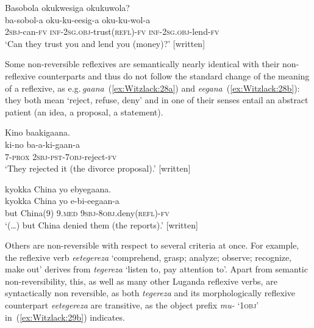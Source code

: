 \documentclass[output=paper,colorlinks,citecolor=brown,
]{langscibook}
\begin{document}
\ea \label{ex:Witzlack:27}
 
    \glll Basobola okukwesiga okukuwola?\\
    ba-sobol-a	oku-ku-eesig-a	oku-ku-wol-a\\
    \textsc{2sbj}-can-\textsc{fv}	\textsc{inf-2sg.obj}-trust(\textsc{refl})-\textsc{fv}	\textsc{inf-2sg.obj}-lend-\textsc{fv}\\
    \glt ‘Can they trust you and lend you (money)?’ [written] %

\z

Some non-reversible reflexives are semantically nearly identical with their non-reflexive counterparts and thus do not follow the standard change of the meaning of a reflexive, as e.g.\,\emph{gaana}~(\ref{ex:Witzlack:28a}) and \emph{eegana}~(\ref{ex:Witzlack:28b}): they both mean ‘reject, refuse, deny’ and in one of their senses entail an abstract patient (an idea, a proposal, a statement). 

\ea\label{ex:Witzlack:28}

\ea \label{ex:Witzlack:28a}
    \glll Kino baakigaana.\\
    ki-no	ba-a-ki-gaan-a\\
    \textsc{7-prox} \textsc{2sbj}-\textsc{pst-7obj}-reject-\textsc{fv}\\
    \glt ‘They rejected it (the divorce proposal).’ [written] %

\ex \label{ex:Witzlack:28b}
    \glll kyokka China yo ebyegaana.\\
    kyokka	China 	yo 	e-bi-eegaan-a\\
    but		China(9) 9.\textsc{med}	\textsc{9sbj-8obj}.deny(\textsc{refl})-\textsc{fv}\\
    \glt ‘(…) but China denied them (the reports).’ [written] %


\z
\z

Others are non-reversible with respect to several criteria at once. 
For example, the reflexive verb \emph{eetegereza} ‘comprehend, grasp; analyze; observe; recognize, make out’ derives from \emph{tegereza} ‘listen to, pay attention to’. 
Apart from semantic non-reversibility, this, as well as many other Luganda reflexive verbs, are syntactically non reversible, as both \emph{tegereza} and its morphologically reflexive counterpart \emph{eetegereza} are transitive, as the object prefix \emph{mu-} ‘1\textsc{obj}’ in~(\ref{ex:Witzlack:29b}) indicates.
\end{document}
